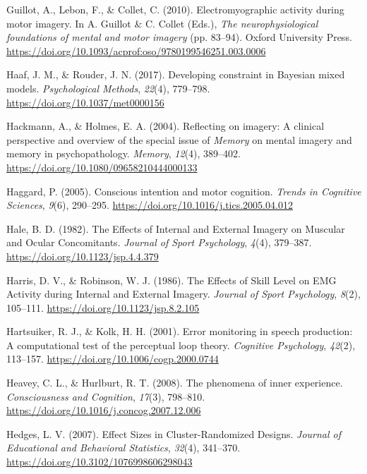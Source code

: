 \documentclass[a4paper,12pt,twoside,openright,oldfontcommands,final]{memoir}
\begin{document}
\leavevmode\hypertarget{ref-guillot_electromyographic_2010}{}%
Guillot, A., Lebon, F., \& Collet, C. (2010). Electromyographic activity during motor imagery. In A. Guillot \& C. Collet (Eds.), \emph{The neurophysiological foundations of mental and motor imagery} (pp. 83--94). Oxford University Press. \url{https://doi.org/10.1093/acprof:oso/9780199546251.003.0006}

\leavevmode\hypertarget{ref-haaf_developing_2017}{}%
Haaf, J. M., \& Rouder, J. N. (2017). Developing constraint in Bayesian mixed models. \emph{Psychological Methods}, \emph{22}(4), 779--798. \url{https://doi.org/10.1037/met0000156}

\leavevmode\hypertarget{ref-hackmann_reflecting_2004}{}%
Hackmann, A., \& Holmes, E. A. (2004). Reflecting on imagery: A clinical perspective and overview of the special issue of \emph{Memory} on mental imagery and memory in psychopathology. \emph{Memory}, \emph{12}(4), 389--402. \url{https://doi.org/10.1080/09658210444000133}

\leavevmode\hypertarget{ref-haggard_conscious_2005}{}%
Haggard, P. (2005). Conscious intention and motor cognition. \emph{Trends in Cognitive Sciences}, \emph{9}(6), 290--295. \url{https://doi.org/10.1016/j.tics.2005.04.012}

\leavevmode\hypertarget{ref-hale_effects_1982}{}%
Hale, B. D. (1982). The Effects of Internal and External Imagery on Muscular and Ocular Concomitants. \emph{Journal of Sport Psychology}, \emph{4}(4), 379--387. \url{https://doi.org/10.1123/jsp.4.4.379}

\leavevmode\hypertarget{ref-harris_effects_1986}{}%
Harris, D. V., \& Robinson, W. J. (1986). The Effects of Skill Level on EMG Activity during Internal and External Imagery. \emph{Journal of Sport Psychology}, \emph{8}(2), 105--111. \url{https://doi.org/10.1123/jsp.8.2.105}

\leavevmode\hypertarget{ref-hartsuiker_error_2001}{}%
Hartsuiker, R. J., \& Kolk, H. H. (2001). Error monitoring in speech production: A computational test of the perceptual loop theory. \emph{Cognitive Psychology}, \emph{42}(2), 113--157. \url{https://doi.org/10.1006/cogp.2000.0744}

\leavevmode\hypertarget{ref-heavey_phenomena_2008}{}%
Heavey, C. L., \& Hurlburt, R. T. (2008). The phenomena of inner experience. \emph{Consciousness and Cognition}, \emph{17}(3), 798--810. \url{https://doi.org/10.1016/j.concog.2007.12.006}

\leavevmode\hypertarget{ref-hedges_effect_2007}{}%
Hedges, L. V. (2007). Effect Sizes in Cluster-Randomized Designs. \emph{Journal of Educational and Behavioral Statistics}, \emph{32}(4), 341--370. \url{https://doi.org/10.3102/1076998606298043}
\end{document}
